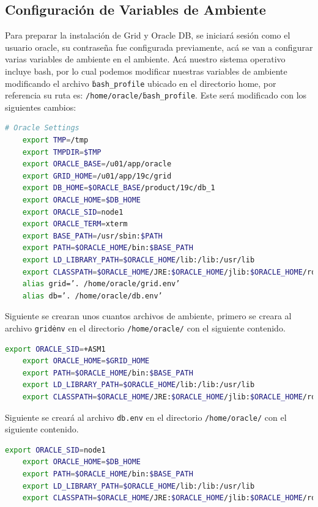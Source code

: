 \documentclass{article}
\begin{document}
\subsection{Configuración de Variables de Ambiente}

Para preparar la instalación de Grid y Oracle DB, se iniciará sesión como el usuario oracle, su contraseña fue configurada previamente, acá se van a configurar varias variables de ambiente en el ambiente. Acá nuestro sistema operativo incluye bash, por lo cual podemos modificar nuestras variables de ambiente modificando el archivo \texttt{\.bash\_profile} ubicado en el directorio home, por referencia su ruta es: \texttt{/home/oracle/\.bash\_profile}. Este será modificado con los siguientes cambios:

\begin{lstlisting}[style=mystyle,language=bash]
	# Oracle Settings
	export TMP=/tmp
	export TMPDIR=$TMP
	export ORACLE_BASE=/u01/app/oracle
	export GRID_HOME=/u01/app/19c/grid
	export DB_HOME=$ORACLE_BASE/product/19c/db_1
	export ORACLE_HOME=$DB_HOME
	export ORACLE_SID=node1
	export ORACLE_TERM=xterm
	export BASE_PATH=/usr/sbin:$PATH
	export PATH=$ORACLE_HOME/bin:$BASE_PATH
	export LD_LIBRARY_PATH=$ORACLE_HOME/lib:/lib:/usr/lib
	export CLASSPATH=$ORACLE_HOME/JRE:$ORACLE_HOME/jlib:$ORACLE_HOME/rdbms/jlib
	alias grid=’. /home/oracle/grid.env’
	alias db=’. /home/oracle/db.env’
\end{lstlisting}

Siguiente se crearan unos cuantos archivos de ambiente, primero se creara al archivo \texttt{grid\.env} en el directorio \texttt{/home/oracle/} con el siguiente contenido.

\begin{lstlisting}[style=mystyle,language=bash]
	export ORACLE_SID=+ASM1
	export ORACLE_HOME=$GRID_HOME
	export PATH=$ORACLE_HOME/bin:$BASE_PATH
	export LD_LIBRARY_PATH=$ORACLE_HOME/lib:/lib:/usr/lib
	export CLASSPATH=$ORACLE_HOME/JRE:$ORACLE_HOME/jlib:$ORACLE_HOME/rdbms/jlib
\end{lstlisting}

Siguiente se creará al archivo \texttt{db.env} en el directorio \texttt{/home/oracle/} con el siguiente contenido.

\begin{lstlisting}[style=mystyle,language=bash]
	export ORACLE_SID=node1
	export ORACLE_HOME=$DB_HOME
	export PATH=$ORACLE_HOME/bin:$BASE_PATH
	export LD_LIBRARY_PATH=$ORACLE_HOME/lib:/lib:/usr/lib
	export CLASSPATH=$ORACLE_HOME/JRE:$ORACLE_HOME/jlib:$ORACLE_HOME/rdbms/jlib
\end{lstlisting}
\end{document}
